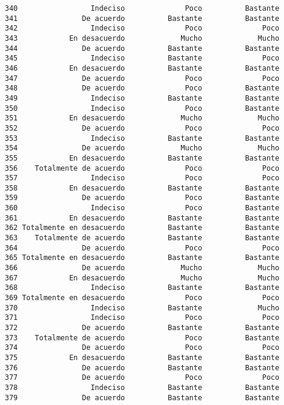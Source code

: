 \documentclass[
  letterpaper,
  DIV=11,
  numbers=noendperiod]{scrartcl}
\begin{document}
\begin{verbatim}
340                 Indeciso              Poco          Bastante
341               De acuerdo          Bastante          Bastante
342                 Indeciso              Poco              Poco
343            En desacuerdo             Mucho             Mucho
344               De acuerdo          Bastante          Bastante
345                 Indeciso          Bastante              Poco
346            En desacuerdo          Bastante          Bastante
347               De acuerdo              Poco              Poco
348               De acuerdo              Poco          Bastante
349                 Indeciso          Bastante          Bastante
350                 Indeciso              Poco          Bastante
351            En desacuerdo             Mucho             Mucho
352               De acuerdo              Poco              Poco
353                 Indeciso          Bastante          Bastante
354               De acuerdo             Mucho             Mucho
355            En desacuerdo          Bastante          Bastante
356    Totalmente de acuerdo              Poco              Poco
357                 Indeciso              Poco              Poco
358            En desacuerdo          Bastante          Bastante
359               De acuerdo              Poco          Bastante
360                 Indeciso              Poco          Bastante
361            En desacuerdo          Bastante          Bastante
362 Totalmente en desacuerdo          Bastante          Bastante
363    Totalmente de acuerdo          Bastante          Bastante
364               De acuerdo              Poco              Poco
365 Totalmente en desacuerdo          Bastante          Bastante
366               De acuerdo             Mucho             Mucho
367            En desacuerdo             Mucho             Mucho
368                 Indeciso          Bastante          Bastante
369 Totalmente en desacuerdo              Poco              Poco
370                 Indeciso          Bastante             Mucho
371                 Indeciso              Poco              Poco
372               De acuerdo          Bastante          Bastante
373    Totalmente de acuerdo              Poco          Bastante
374               De acuerdo              Poco              Poco
375            En desacuerdo          Bastante          Bastante
376               De acuerdo          Bastante          Bastante
377               De acuerdo              Poco              Poco
378                 Indeciso          Bastante          Bastante
379               De acuerdo          Bastante          Bastante

\end{verbatim}
\end{document}
